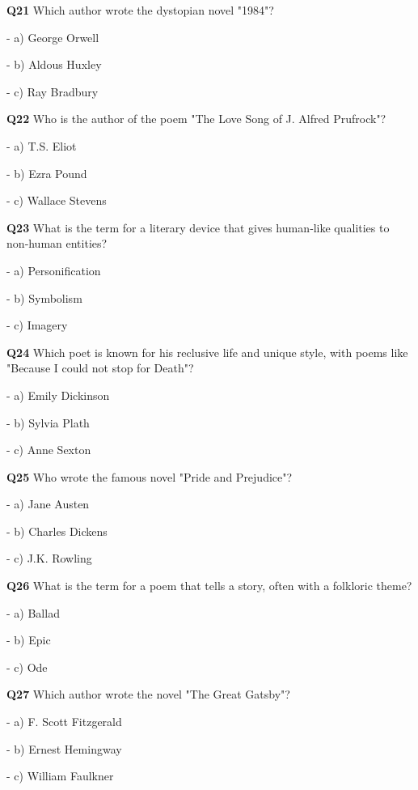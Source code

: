 \textbf{Q21} Which author wrote the dystopian novel "1984"?\par
\quad - a) George Orwell\par
\quad - b) Aldous Huxley\par
\quad - c) Ray Bradbury\par

\textbf{Q22} Who is the author of the poem "The Love Song of J. Alfred Prufrock"?\par
\quad - a) T.S. Eliot\par
\quad - b) Ezra Pound\par
\quad - c) Wallace Stevens\par

\textbf{Q23} What is the term for a literary device that gives human‑like qualities to non‑human entities?\par
\quad - a) Personification\par
\quad - b) Symbolism\par
\quad - c) Imagery\par

\textbf{Q24} Which poet is known for his reclusive life and unique style, with poems like "Because I could not stop for Death"?\par
\quad - a) Emily Dickinson\par
\quad - b) Sylvia Plath\par
\quad - c) Anne Sexton\par

\textbf{Q25} Who wrote the famous novel "Pride and Prejudice"?\par
\quad - a) Jane Austen\par
\quad - b) Charles Dickens\par
\quad - c) J.K. Rowling\par

\textbf{Q26} What is the term for a poem that tells a story, often with a folkloric theme?\par
\quad - a) Ballad\par
\quad - b) Epic\par
\quad - c) Ode\par

\textbf{Q27} Which author wrote the novel "The Great Gatsby"?\par
\quad - a) F. Scott Fitzgerald\par
\quad - b) Ernest Hemingway\par
\quad - c) William Faulkner\par

